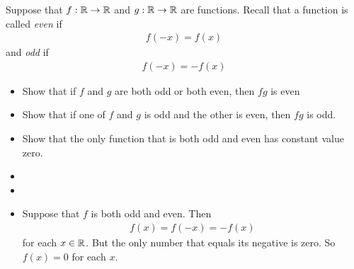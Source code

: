 \documentclass[11pt]{article}
\begin{document}
\begin{exercise}
    Suppose that $f : \mathbb{R} \rightarrow \mathbb{R}$ and $g : \mathbb{R} \rightarrow \mathbb{R}$ are functions. 
    Recall that a function is called \textit{even} if 
    \begin{align*}
        f(-x) = f(x)
    \end{align*}
    and \textit{odd} if 
    \begin{align*}
        f(-x) = - f(x)
    \end{align*}
    \begin{itemize}
     \item Show that if $f$ and $g$ are both odd or both even, then $fg$ is even 
     \item Show that if one of $f$ and $g$ is odd and the other is even, then $fg$ is odd.
     \item Show that the only function that is both odd and even has constant value zero. 
    \end{itemize}
\end{exercise}
\begin{solution}
    \begin{itemize}
     \item 
     \item 
     \item Suppose that $f$ is both odd and even. Then 
     \begin{align*}
        f(x) = f(-x) = -f(x)
     \end{align*}
     for each $x \in \mathbb{R}$. But the only number that equals its negative is zero. So $f(x) = 0$ for each $x$.
    \end{itemize}

\end{solution}
\end{document}
